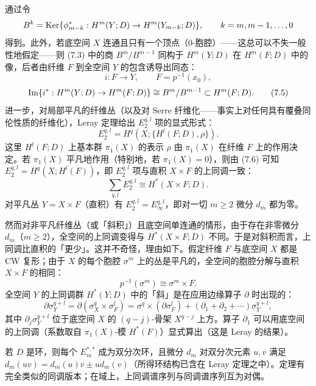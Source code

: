通过令
\[
B^k=\operatorname{Ker}\{\phi^*_{m-k}:H^m(Y;D)\to H^m(Y_{m-k};D)\},\qquad k=m,m-1,\dots,0
\]
得到。此外，若底空间 $X$ 连通且只有一个顶点（0-胞腔）——这总可以不失一般性地假定——则 (7.3) 中的商 $B^m/B^{m-1}$ 同构于 $H^m(Y;D)$ 在 $H^m(F;D)$ 中的像，后者由纤维 $F$ 到全空间 $Y$ 的包含诱导出同态：
\[
i:F\longrightarrow Y,\qquad F=p^{-1}(x_0),
\]
\begin{equation}
\operatorname{Im}\{i^*:H^m(Y;D)\to H^m(F;D)\}\cong B^m/B^{m-1}\subset H^m(F;D). \tag{7.5}
\end{equation}
进一步，对局部平凡的纤维丛（以及对 Serre 纤维化——事实上对任何具有覆叠同伦性质的纤维化），Leray 定理给出 $E_2^{q,l}$ 项的显式形式：
\begin{equation}
E_2^{q,l}=H^q(X;\{H^l(F;D),\rho\}). \tag{7.6}
\end{equation}
这里 $H^l(F;D)$ 上基本群 $\pi_1(X)$ 的表示 $\rho$ 由 $\pi_1(X)$ 在纤维 $F$ 上的作用决定。若 $\pi_1(X)$ 平凡地作用（特别地，若 $\pi_1(X)=0$），则由 (7.6) 可知 $E_2^{q,l}=H^q(X;H^l(F))$，即 $E_2^{q,l}$ 项与直积 $X\times F$ 的上同调一致：
\begin{equation}
\sum_{q,l}E_2^{q,l}\cong H^*(X\times F;D). \tag{7.7}
\end{equation}
对平凡丛 $Y=X\times F$（直积）有 $E_2^{q,l}=E_\infty^{q,l}$，即对一切 $m\ge2$ 微分 $d_m$ 都为零。

然而对非平凡纤维丛（或「斜积」）且底空间单连通的情形，由于存在非零微分 $d_m$（$m\ge2$），全空间的上同调变得与 $H^*(X\times F;D)$ 不同。于是对斜积而言，上同调比直积的「更少」。这并不奇怪，理由如下。假定纤维 $F$ 与底空间 $X$ 都是 CW 复形；由于 $X$ 的每个胞腔 $\sigma^m$ 上的丛是平凡的，全空间的胞腔分解与直积 $X\times F$ 的相同：
\[
p^{-1}(\sigma^m)\cong\sigma^m\times F.
\]
全空间 $Y$ 的上同调群 $H^*(Y;D)$ 中的「斜」是在应用边缘算子 $\partial$ 时出现的：
\[
\partial\sigma_Y^{q+l}=\partial(\sigma_X^q\times\sigma_F^l)=\sigma^q\times(\partial\sigma_F^l)+(\partial_1+\partial_2+\cdots)\sigma_Y^{q+l},
\]
其中 $\partial_j\sigma_Y^{q+l}$ 位于底空间 $X$ 的 $(q-j)$-骨架 $X^{q-j}$ 上方。算子 $\partial_1$ 可以用底空间的上同调（系数取自 $\pi_1(X)$-模 $H^*(F)$）显式算出（这是 Leray 的结果）。


若 $D$ 是环，则每个 $E_m^{*,*}$ 成为双分次环，且微分 $d_m$ 对双分次元素 $u,v$ 满足 $d_m(uv)=d_m(u)v\pm ud_m(v)$（所得环结构已含在 Leray 定理之中）。定理有完全类似的同调版本；在域上，上同调谱序列与同调谱序列互为对偶。

